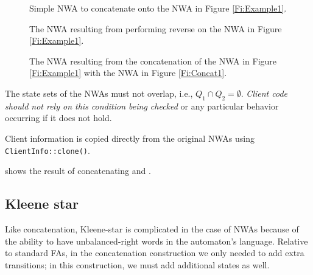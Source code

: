\begin{figure}[p]
  \centering
  \begin{minipage}{0.5\textwidth}
    \begin{minipage}{\textwidth}
      \centering
      \caption{Simple NWA to concatenate onto the NWA in Figure \ref{Fi:Example1}.}
      \label{Fi:Concat1}
    \end{minipage}

    \vspace{2\baselineskip}
    \begin{minipage}{0.8\textwidth}
      \centering
      \caption{The NWA resulting from performing reverse on the NWA in Figure \ref{Fi:Example1}.}
      \label{Fi:Reverse1}
    \end{minipage}
  \end{minipage}
  \begin{minipage}{0.49\textwidth}
    \centering
    \caption{The NWA resulting from the concatenation of the NWA in Figure
      \ref{Fi:Example1} with the NWA in Figure \ref{Fi:Concat1}.}
    \label{Fi:Concat2}
  \end{minipage}
\end{figure}

\antistupidfloats



The state sets of the NWAs must not overlap,
i.e., $Q_1 \cap Q_2 = \emptyset$. \textsl{Client code should not rely on
  this condition being checked} or any particular behavior occurring if it
does not hold.

Client information is copied directly from the original NWAs using
\texttt{ClientInfo::clone()}.

 shows the result of concatenating  and
.

\subsection{Kleene star}
\label{Se:Star}

Like concatenation, Kleene-star is complicated in the case of NWAs because of
the ability to have unbalanced-right words in the automaton's
language. Relative to standard FAs, in the concatenation construction we only needed
to add extra transitions; in this construction, we must add additional states as well.

